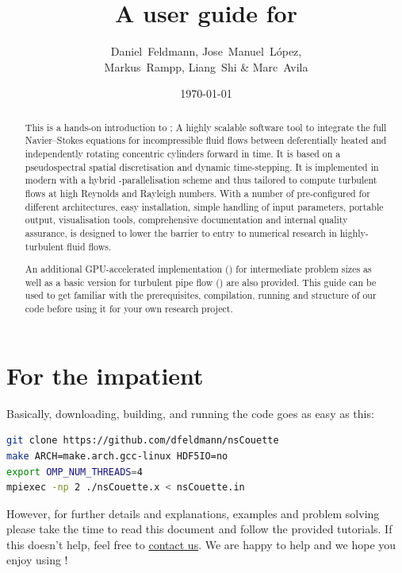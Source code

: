 \documentclass[a4paper, 11pt, DIV=11]{scrartcl}
\title{A user guide for \nsc}
\author{Daniel~Feldmann, Jose~Manuel~L\'opez,\\ Markus~Rampp, Liang~Shi \& Marc~Avila}
\date{\today}
\begin{document}
\maketitle

\begin{abstract}
This is a hands-on introduction to \nsc; A highly scalable software tool
to integrate the full Navier--Stokes equations for incompressible fluid
flows between deferentially heated and independently rotating concentric
cylinders forward in time. It is based on a pseudospectral spatial
discretisation and dynamic time-stepping. It is implemented in modern
\fortran with a hybrid \mpi-\omp parallelisation scheme and thus tailored
to compute turbulent flows at high Reynolds and Rayleigh numbers. With a
number of pre-configured  for different architectures,
easy installation, simple handling of input parameters, portable
 output, visualisation tools, comprehensive documentation and
internal quality assurance, \nsc is designed to lower the barrier to entry
to numerical research in highly-turbulent fluid flows.
\par
An additional GPU-accelerated implementation (\cuda) for intermediate problem
sizes as well as a basic version for turbulent pipe flow (\nsp) are also
provided. This guide can be used to get familiar with the prerequisites,
compilation, running and structure of our code before using it for your
own research project.
\end{abstract}
\tableofcontents

\section{For the impatient}
\label{sec:forTheImpatient}

Basically, downloading, building, and running the code goes as easy as this:
\begin{lstlisting}[language=bash]
git clone https://github.com/dfeldmann/nsCouette
make ARCH=make.arch.gcc-linux HDF5IO=no
export OMP_NUM_THREADS=4
mpiexec -np 2 ./nsCouette.x < nsCouette.in
\end{lstlisting}
However, for further details and explanations, examples and problem solving
please take the time to read this document and follow the provided tutorials.
If this doesn't help, feel free to \href{mailto:nsCouette@zarm.uni-bremen.de}{contact us}.
We are happy to help and we hope you enjoy using \nsc!
\end{document}
